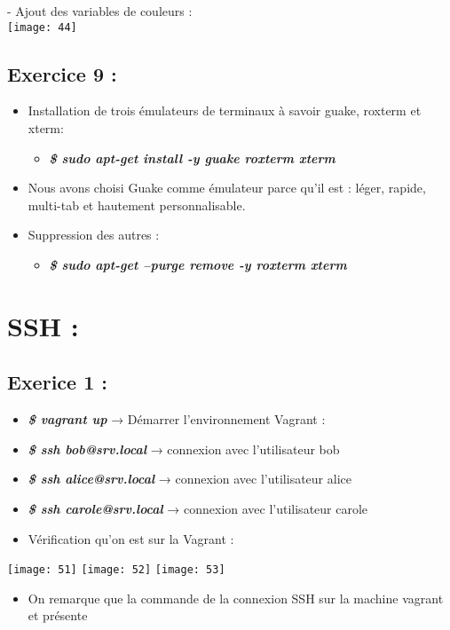 \documentclass[a4paper]{article}
\begin{document}
	\hfill \break
	- Ajout des variables de couleurs : \\
	\texttt{[image: 44]}
	

\subsection*{Exercice 9 :}
	\begin{itemize}
		\item Installation de trois émulateurs de terminaux à savoir guake, roxterm et xterm: 
			\begin{itemize}
				\item \textit{\textbf{\$ sudo apt-get install -y guake roxterm xterm}}
			\end{itemize}
		\item Nous avons choisi Guake comme émulateur parce qu'il est : léger, rapide, multi-tab et hautement personnalisable.
		\item Suppression des autres : 
		\begin{itemize}
				\item \textit{\textbf{\$ sudo apt-get --purge remove -y roxterm xterm}}
			\end{itemize}
	\end{itemize}
	
\newpage
	\section{SSH :}
	\subsection{Exerice 1 :}
	\begin{itemize}
		\item \textbf{\textit{\$ vagrant up }} →  Démarrer l'environnement Vagrant : 
		\item \textbf{\textit{\$ ssh bob@srv.local }} → connexion avec l'utilisateur bob
		\item \textbf{\textit{\$ ssh alice@srv.local }} → connexion avec l'utilisateur alice
		\item \textbf{\textit{\$ ssh carole@srv.local }} → connexion avec l'utilisateur carole 
		\item Vérification qu'on est sur la Vagrant :
	\end{itemize}
	
	\texttt{[image: 51]}
	\texttt{[image: 52]}
	\texttt{[image: 53]}
	\begin{itemize}
		\item On remarque que la commande de la connexion SSH sur la machine vagrant et présente
	\end{itemize}
	
	
\end{document}
